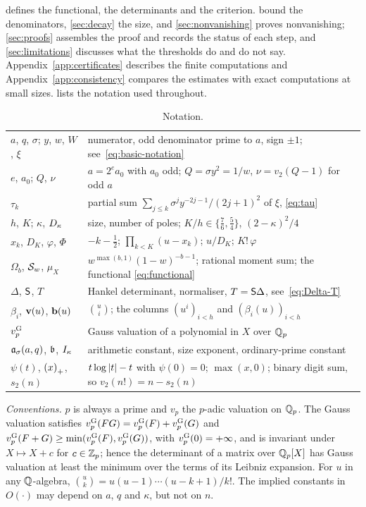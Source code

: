 defines the functional, the determinants and the criterion.
 bound the denominators, \cref{sec:decay} the
size, and \cref{sec:nonvanishing} proves nonvanishing; \cref{sec:proofs} assembles the proof and
records the status of each step, and \cref{sec:limitations} discusses what the thresholds do and
do not say. Appendix~\ref{app:certificates} describes the finite computations and
Appendix~\ref{app:consistency} compares the estimates with exact computations at small sizes.
 lists the notation used throughout.

\begin{table}[ht]
\centering
\caption{Notation.}\label{tab:notation}
\small
\begin{tabular}{@{}p{}p{}@{}}
\toprule
$a$, $q$, $\sigma$; $y$, $w$, $W$, $\xi$ & numerator, odd denominator prime to $a$, sign $\pm1$;
see~\eqref{eq:basic-notation}\\
$e$, $a_0$; $Q$, $\nu$ & $a=2^ea_0$ with $a_0$ odd; $Q=\sigma y^2=1/w$, $\nu=v_2(Q-1)$ for odd
$a$\\
$\tau_k$ & partial sum $\sum_{j\le k}\sigma^jy^{-2j-1}/(2j+1)^2$ of $\xi$, \eqref{eq:tau}\\
$h$, $K$; $\kappa$, $D_\kappa$ & size, number of poles; $K/h\in\{\frac76,\frac54\}$,
$(2-\kappa)^2/4$\\
$x_k$, $D_K$, $\varphi$, $\Phi$ & $-k-\frac12$; $\prod_{k<K}(u-x_k)$; $u/D_K$; $K!\,\varphi$\\
$\Omega_b$, $\mathcal{S}_w$, $\mu_X$ & $w^{\max(b,1)}(1-w)^{-b-1}$; rational moment sum; the functional
\eqref{eq:functional}\\
$\Delta$, $\mathsf{S}$, $T$ & Hankel determinant, normaliser, $T=\mathsf{S}\Delta$, see~\eqref{eq:Delta-T}\\
$\beta_i$, $\mathbf{v}(u)$, $\mathbf{b}(u)$ & $\binom ui$; the columns $(u^i)_{i<h}$ and
$(\beta_i(u))_{i<h}$\\
$v_{p}^{\mathrm{G}}$ & Gauss valuation of a polynomial in $X$ over $\mathbb{Q}_p$\\
$\mathfrak{a}_\sigma(a,q)$, $\mathfrak{b}$, $I_\kappa$ & arithmetic constant, size exponent,
ordinary-prime constant\\
$\psi(t)$, $\left(x\right)_{+}$, $s_2(n)$ & $t\log\left\lvert t\right\rvert-t$ with $\psi(0)=0$; $\max(x,0)$; binary digit
sum, so $v_2(n!)=n-s_2(n)$\\
\bottomrule
\end{tabular}
\end{table}

\emph{Conventions.} $p$ is always a prime and $v_p$ the $p$-adic valuation on $\mathbb{Q}_p$. The Gauss
valuation satisfies $v_{p}^{\mathrm{G}}(FG)=v_{p}^{\mathrm{G}}(F)+v_{p}^{\mathrm{G}}(G)$ and $v_{p}^{\mathrm{G}}(F+G)\ge\min(v_{p}^{\mathrm{G}}(F),v_{p}^{\mathrm{G}}(G))$, with
$v_{p}^{\mathrm{G}}(0)=+\infty$, and is invariant under $X\mapsto X+c$ for $c\in\mathbb{Z}_p$; hence the determinant of
a matrix over $\mathbb{Q}_p[X]$ has Gauss valuation at least the minimum over the terms of its Leibniz
expansion. For $u$ in any $\mathbb{Q}$-algebra, $\binom uk=u(u-1)\cdots(u-k+1)/k!$. The implied constants
in $O(\cdot)$ may depend on $a$, $q$ and $\kappa$, but not on $n$.
